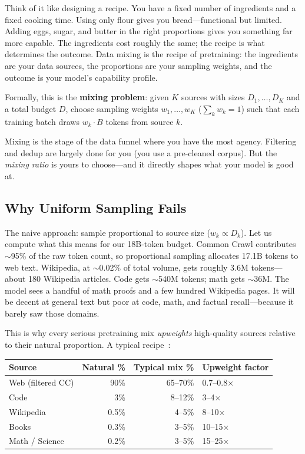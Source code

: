 Think of it like designing a recipe. You have a fixed number of ingredients and a fixed cooking time. Using only flour gives you bread---functional but limited. Adding eggs, sugar, and butter in the right proportions gives you something far more capable. The ingredients cost roughly the same; the recipe is what determines the outcome. Data mixing is the recipe of pretraining: the ingredients are your data sources, the proportions are your sampling weights, and the outcome is your model's capability profile.

Formally, this is the \textbf{mixing problem}: given $K$ sources with sizes $D_1, \ldots, D_K$ and a total budget $D$, choose sampling weights $w_1, \ldots, w_K$ ($\sum_k w_k = 1$) such that each training batch draws $w_k \cdot B$ tokens from source $k$.

Mixing is the stage of the data funnel where you have the most agency. Filtering and dedup are largely done for you (you use a pre-cleaned corpus). But the \emph{mixing ratio} is yours to choose---and it directly shapes what your model is good at.

\subsection{Why Uniform Sampling Fails}
\label{sec:uniform-bad}

The naive approach: sample proportional to source size ($w_k \propto D_k$). Let us compute what this means for our 18B-token budget. Common Crawl contributes $\sim$95\% of the raw token count, so proportional sampling allocates 17.1B tokens to web text. Wikipedia, at $\sim$0.02\% of total volume, gets roughly 3.6M tokens---about 180 Wikipedia articles. Code gets $\sim$540M tokens; math gets $\sim$36M. The model sees a handful of math proofs and a few hundred Wikipedia pages. It will be decent at general text but poor at code, math, and factual recall---because it barely saw those domains.

This is why every serious pretraining mix \emph{upweights} high-quality sources relative to their natural proportion. A typical recipe~\cite{touvron2023llama}:

\begin{center}
\begin{tabularx}{\textwidth}{@{}lrrX@{}}
\toprule
\textbf{Source} & \textbf{Natural \%} & \textbf{Typical mix \%} & \textbf{Upweight factor} \\
\midrule
Web (filtered CC) & 90\% & 65--70\% & 0.7--0.8$\times$ \\
Code & 3\% & 8--12\% & 3--4$\times$ \\
Wikipedia & 0.5\% & 4--5\% & 8--10$\times$ \\
Books & 0.3\% & 3--5\% & 10--15$\times$ \\
Math / Science & 0.2\% & 3--5\% & 15--25$\times$ \\
\bottomrule
\end{tabularx}
\end{center}

